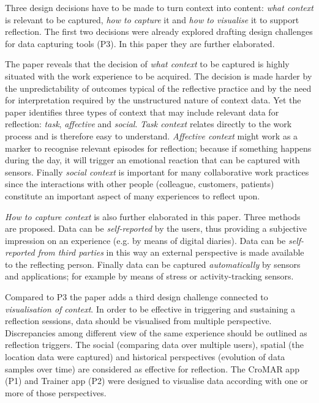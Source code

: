Three design decisions have to be made to turn context into content: \emph{what context} is relevant to be captured, \emph{how to capture} it and \emph{how to visualise} it to support reflection. The first two decisions were already explored drafting design challenges for data capturing tools (P3). In this paper they are further elaborated.

The paper reveals that the decision of \emph{what context} to be captured is highly situated with the work experience to be acquired. The decision is made harder by the unpredictability of outcomes typical of the reflective practice and by the need for interpretation required by the unstructured nature of context data. Yet the paper identifies three types of context that may include relevant data for reflection: \emph{task}, \emph{affective} and \emph{social}. \emph{Task context} relates directly to the work process and is therefore easy to understand. \emph{Affective context} might work as a marker to recognise relevant episodes for reflection; because if something happens during the day, it will trigger an emotional reaction that can be captured with sensors. Finally \emph{social context} is important for many collaborative work practices since the interactions with other people (colleague, customers, patients) constitute an important aspect of many experiences to reflect upon.

\emph{How to capture context} is also further elaborated in this paper. Three methods are proposed. Data can be \emph{self-reported} by the users, thus providing a subjective impression on an experience (e.g. by means of digital diaries). Data can be \emph{self-reported from third parties} in this way an external perspective is made available to the reflecting person. Finally data can be captured \emph{automatically} by sensors and applications; for example by means of stress or activity-tracking sensors.

Compared to P3 the paper adds a third design challenge connected to \emph{visualisation of context}. In order to be effective in triggering and sustaining a reflection sessions, data should be visualised from multiple perspective. Discrepancies among different view of the same experience should be outlined as reflection triggers. The social (comparing data over multiple users), spatial (the location data were captured) and historical perspectives (evolution of data samples over time) are considered as effective for reflection. The CroMAR app (P1) and Trainer app (P2) were designed to visualise data according with one or more of those perspectives.

